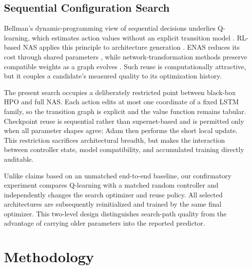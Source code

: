 \documentclass[conference]{IEEEtran}
\begin{document}
\subsection{Sequential Configuration Search}
Bellman's dynamic-programming view of sequential decisions \cite{bellman1957markovian} underlies Q-learning, which estimates action values without an explicit transition model \cite{watkins1992q}. RL-based NAS applies this principle to architecture generation \cite{zoph2017nas}. ENAS reduces its cost through shared parameters \cite{pham2018enas}, while network-transformation methods preserve compatible weights as a graph evolves \cite{cai2018efficient}. Such reuse is computationally attractive, but it couples a candidate's measured quality to its optimization history.

The present search occupies a deliberately restricted point between black-box HPO and full NAS. Each action edits at most one coordinate of a fixed LSTM family, so the transition graph is explicit and the value function remains tabular. Checkpoint reuse is sequential rather than supernet-based and is permitted only when all parameter shapes agree; Adam \cite{kingma2015adam} then performs the short local update. This restriction sacrifices architectural breadth, but makes the interaction between controller state, model compatibility, and accumulated training directly auditable.

Unlike claims based on an unmatched end-to-end baseline, our confirmatory experiment compares Q-learning with a matched random controller and independently changes the search optimizer and reuse policy. All selected architectures are subsequently reinitialized and trained by the same final optimizer. This two-level design distinguishes search-path quality from the advantage of carrying older parameters into the reported predictor.

\section{Methodology}
\end{document}
